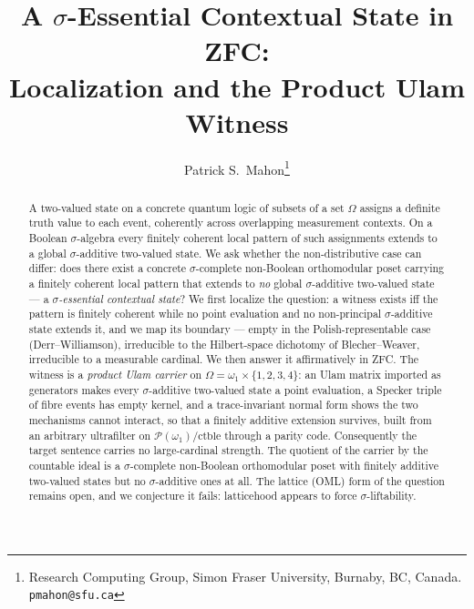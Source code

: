 \documentclass[11pt]{article}
\title{A $\sigma$-Essential Contextual State in ZFC:\\
Localization and the Product Ulam Witness}
\author{Patrick S.\ Mahon\thanks{%
  Research Computing Group, Simon Fraser University, Burnaby, BC, Canada.
  \texttt{pmahon@sfu.ca}}}
\date{}
\theoremstyle{definition}
\newif\ifstandalone
\begin{document}
\maketitle

\begin{abstract}
A two-valued state on a concrete quantum logic of subsets of a set $\Omega$
assigns a definite truth value to each event, coherently across overlapping
measurement contexts. On a Boolean $\sigma$-algebra every finitely coherent
local pattern of such assignments extends to a global $\sigma$-additive
two-valued state. We ask whether the non-distributive case can differ: does
there exist a concrete $\sigma$-complete non-Boolean orthomodular poset
carrying a finitely coherent local pattern that extends to \emph{no} global
$\sigma$-additive two-valued state --- a \emph{$\sigma$-essential contextual
state}? We first localize the question: a witness exists iff the pattern is
finitely coherent while no point evaluation and no non-principal
$\sigma$-additive state extends it, and we map its boundary --- empty in the
Polish-representable case (Derr--Williamson), irreducible to the Hilbert-space
dichotomy of Blecher--Weaver, irreducible to a measurable cardinal. We then
answer it affirmatively in ZFC. The witness is a \emph{product Ulam carrier} on
$\Omega=\omega_1\times\{1,2,3,4\}$: an Ulam matrix imported as generators
makes every $\sigma$-additive two-valued state a point evaluation, a Specker
triple of fibre events has empty kernel, and a trace-invariant normal form
shows the two mechanisms cannot interact, so that a finitely additive extension
survives, built from an arbitrary ultrafilter on
$\mathcal P(\omega_1)/\mathrm{ctble}$ through a parity code. Consequently the
target sentence carries no large-cardinal strength. The quotient of the carrier
by the countable ideal is a $\sigma$-complete non-Boolean orthomodular poset
with finitely additive two-valued states but no $\sigma$-additive ones at all.
The lattice (OML) form of the question remains open, and we conjecture it fails:
latticehood appears to force $\sigma$-liftability.
\end{abstract}

\ifstandalone



\fi
\end{document}
